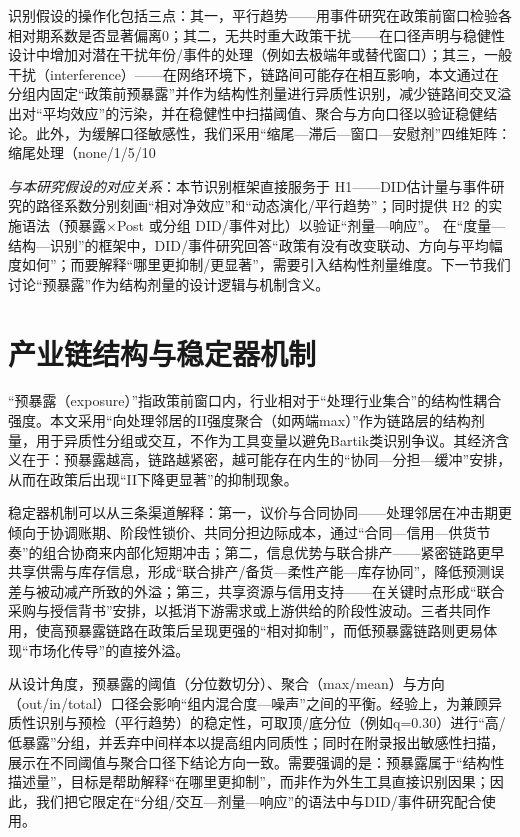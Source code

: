 识别假设的操作化包括三点：其一，平行趋势——用事件研究在政策前窗口检验各相对期系数是否显著偏离0；其二，无共时重大政策干扰——在口径声明与稳健性设计中增加对潜在干扰年份/事件的处理（例如去极端年或替代窗口）；其三，一般干扰（interference）——在网络环境下，链路间可能存在相互影响，本文通过在分组内固定“政策前预暴露”并作为结构性剂量进行异质性识别，减少链路间交叉溢出对“平均效应”的污染，并在稳健性中扫描阈值、聚合与方向口径以验证稳健结论\citep{aronow2017interference,athey2018network}。此外，为缓解口径敏感性，我们采用“缩尾—滞后—窗口—安慰剂”四维矩阵：缩尾处理（none/1/5/10%

\noindent\textit{与本研究假设的对应关系}：本节识别框架直接服务于 H1——DID估计量与事件研究的路径系数分别刻画“相对净效应”和“动态演化/平行趋势”；同时提供 H2 的实施语法（预暴露×Post 或分组 DID/事件对比）以验证“剂量—响应”。
在“度量—结构—识别”的框架中，DID/事件研究回答“政策有没有改变联动、方向与平均幅度如何”；而要解释“哪里更抑制/更显著”，需要引入结构性剂量维度。下一节我们讨论“预暴露”作为结构剂量的设计逻辑与机制含义。

\section{产业链结构与稳定器机制}
“预暴露（exposure）”指政策前窗口内，行业相对于“处理行业集合”的结构性耦合强度。本文采用“向处理邻居的II强度聚合（如两端max）”作为链路层的结构剂量，用于异质性分组或交互，不作为工具变量以避免Bartik类识别争议\citep{goldsmithpinkham2020bartik}。其经济含义在于：预暴露越高，链路越紧密，越可能存在内生的“协同—分担—缓冲”安排，从而在政策后出现“II下降更显著”的抑制现象。

稳定器机制可以从三条渠道解释：第一，议价与合同协同——处理邻居在冲击期更倾向于协调账期、阶段性锁价、共同分担边际成本，通过“合同—信用—供货节奏”的组合协商来内部化短期冲击；第二，信息优势与联合排产——紧密链路更早共享供需与库存信息，形成“联合排产/备货—柔性产能—库存协同”，降低预测误差与被动减产所致的外溢；第三，共享资源与信用支持——在关键时点形成“联合采购与授信背书”安排，以抵消下游需求或上游供给的阶段性波动。三者共同作用，使高预暴露链路在政策后呈现更强的“相对抑制”，而低预暴露链路则更易体现“市场化传导”的直接外溢。

从设计角度，预暴露的阈值（分位数切分）、聚合（max/mean）与方向（out/in/total）口径会影响“组内混合度—噪声”之间的平衡。经验上，为兼顾异质性识别与预检（平行趋势）的稳定性，可取顶/底分位（例如q=0.30）进行“高/低暴露”分组，并丢弃中间样本以提高组内同质性；同时在附录报出敏感性扫描，展示在不同阈值与聚合口径下结论方向一致。需要强调的是：预暴露属于“结构性描述量”，目标是帮助解释“在哪里更抑制”，而非作为外生工具直接识别因果；因此，我们把它限定在“分组/交互—剂量—响应”的语法中与DID/事件研究配合使用。

